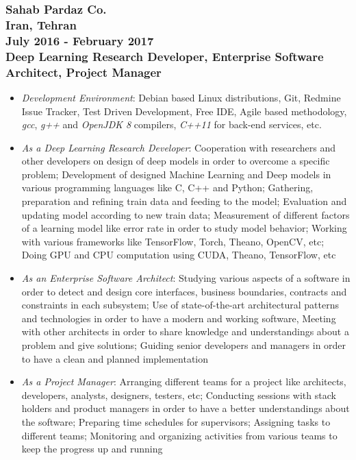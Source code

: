\documentclass[10pt,a4paper]{article}
\begin{document}
\subsubsection{{\large Sahab Pardaz Co.} \\ 
\textnormal{Iran, Tehran} \\ 
\textnormal{July 2016 - February 2017} \\ 
{Deep Learning Research Developer, Enterprise Software Architect, Project Manager}}
  \setlength{\leftskip}{0.5cm}
  \setlength{\rightskip}{1cm}
  \begin{itemize}
    \setlength{\rightskip}{1cm}
    \setlength\itemsep{0em}
    \item \small \textit {Development Environment}: Debian based Linux distributions, Git, Redmine Issue Tracker, Test Driven Development, Free IDE, Agile based methodology, \textit {gcc}, \textit{g++} and \textit{OpenJDK 8} compilers, \textit{C++11} for back-end services, etc.
    \item \small \textit {As a Deep Learning Research Developer}: Cooperation with researchers and other developers on design of deep models in order to overcome a specific problem; Development of designed Machine Learning and Deep models in various programming languages like C, C++ and Python; Gathering, preparation and refining train data and feeding to the model; Evaluation and updating model according to new train data; Measurement of different factors of a learning model like error rate in order to study model behavior; Working with various frameworks like TensorFlow, Torch, Theano, OpenCV, etc; Doing GPU and CPU computation using CUDA, Theano, TensorFlow, etc
    \item \small \textit {As an Enterprise Software Architect}: Studying various aspects of a software in order to detect and design core interfaces, business boundaries, contracts and constraints in each subsystem; Use of state-of-the-art architectural patterns and technologies in order to have a modern and working software, Meeting with other architects in order to share knowledge and understandings about a problem and give solutions; Guiding senior developers and managers in order to have a clean and planned implementation
    \item \small \textit {As a Project Manager}: Arranging different teams for a project like architects, developers, analysts, designers, testers, etc; Conducting sessions with stack holders and product managers in order to have a better understandings about the software; Preparing time schedules for supervisors; Assigning tasks to different teams; Monitoring and organizing activities from various teams to keep the progress up and running
  \end{itemize}
  \setlength{\leftskip}{0pt}
  \setlength{\rightskip}{0cm}
  
\end{document}
